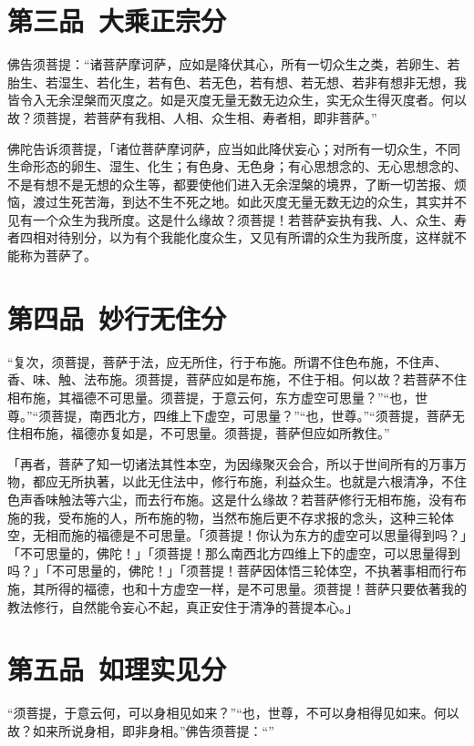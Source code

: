 \documentclass[12pt,twoside,openany]{book}
\newcommand{\kai}[1]{{\CJKfamily{kai}#1}}
\begin{document}
\chapter{第三品\ 大乘正宗分}
\begin{pinyinscope}
佛告须菩提：“诸菩萨摩诃萨，应如是降伏其心，所有一切众生之类，若卵生、若胎生、若湿生、若化生，若有色、若无色，若有想、若无想、若非有想非无想，我皆令入无余涅槃而灭度之。如是灭度无量无数无边众生，实无众生得灭度者。何以故？须菩提，若菩萨有我相、人相、众生相、寿者相，即非菩萨。”
\end{pinyinscope}

\kai{佛陀告诉须菩提，「诸位菩萨摩诃萨，应当如此降伏妄心；对所有一切众生，不同生命形态的卵生、湿生、化生；有色身、无色身；有心思想念的、无心思想念的、不是有想不是无想的众生等，都要使他们进入无余涅槃的境界，了断一切苦报、烦恼，渡过生死苦海，到达不生不死之地。如此灭度无量无数无边的众生，其实并不见有一个众生为我所度。这是什么缘故？须菩提！若菩萨妄执有我、人、众生、寿者四相对待别分，以为有个我能化度众生，又见有所谓的众生为我所度，这样就不能称为菩萨了。}

\chapter{第四品\ 妙行无住分}
\begin{pinyinscope}
“复次，须菩提，菩萨于法，应无所住，行于布施。所谓不住色布施，不住声、香、味、触、法布施。须菩提，菩萨应如是布施，不住于相。何以故？若菩萨不住相布施，其福德不可思量。须菩提，于意云何，东方虚空可思量？”“也，世尊。”“须菩提，南西北方，四维上下虚空，可思量？”“也，世尊。”“须菩提，菩萨无住相布施，福德亦复如是，不可思量。须菩提，菩萨但应如所教住。”
\end{pinyinscope}

\kai{「再者，菩萨了知一切诸法其性本空，为因缘聚灭会合，所以于世间所有的万事万物，都应无所执著，以此无住法中，修行布施，利益众生。也就是六根清净，不住色声香味触法等六尘，而去行布施。这是什么缘故？若菩萨修行无相布施，没有布施的我，受布施的人，所布施的物，当然布施后更不存求报的念头，这种三轮体空，无相而施的福德是不可思量。「须菩提！你认为东方的虚空可以思量得到吗？」「不可思量的，佛陀！」「须菩提！那么南西北方四维上下的虚空，可以思量得到吗？」「不可思量的，佛陀！」「须菩提！菩萨因体悟三轮体空，不执著事相而行布施，其所得的福德，也和十方虚空一样，是不可思量。须菩提！菩萨只要依著我的教法修行，自然能令妄心不起，真正安住于清净的菩提本心。」}

\chapter{第五品\ 如理实见分}
\begin{pinyinscope}
“须菩提，于意云何，可以身相见如来？”“也，世尊，不可以身相得见如来。何以故？如来所说身相，即非身相。”佛告须菩提：“{\color{red}{凡所有相，皆是虚妄。若见诸相非相，即见如来。}}”
\end{pinyinscope}
\end{document}
